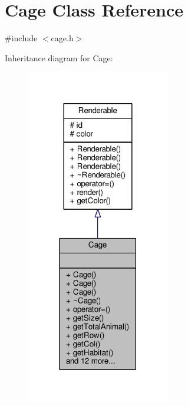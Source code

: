 \hypertarget{classCage}{}\section{Cage Class Reference}
\label{classCage}


{\ttfamily \#include $<$cage.\+h$>$}



Inheritance diagram for Cage\+:
\nopagebreak
\begin{figure}[H]
\begin{center}
\leavevmode
\includegraphics[width=177pt]{classCage__inherit__graph}
\end{center}
\end{figure}


